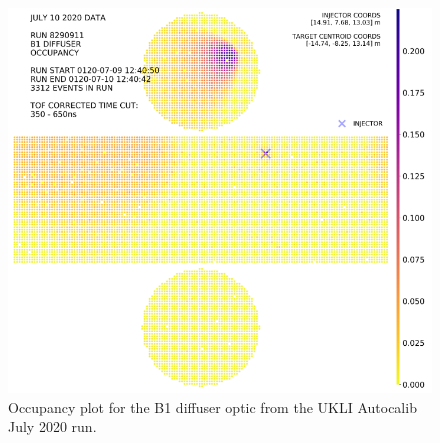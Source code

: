 \begin{figure}
\begin{minipage}{0.47\textwidth}
        \includegraphics[width=\textwidth]{Figures/B1_occupancy_diff_auto.PNG} %
        \caption{Occupancy plot for the B1 diffuser optic from the UKLI Autocalib July 2020 run.}
        \label{fig:B1_diff_auto_July}
    \end{minipage}
\end{figure}


